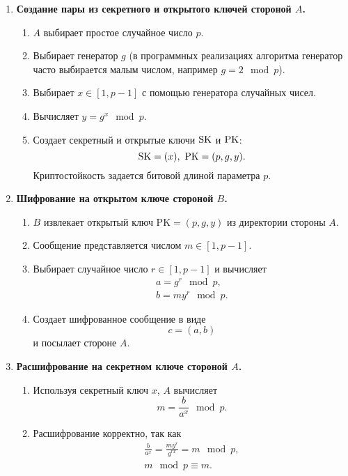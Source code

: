 \begin{enumerate}
    \item \textbf{Создание пары из секретного и открытого ключей стороной $A$.}
        \begin{enumerate}
            \item $A$ выбирает простое случайное число $p$.
            \item Выбирает генератор $g$ (в программных реализациях алгоритма генератор часто выбирается малым числом, например $g = 2 \mod p$).
            \item Выбирает $x \in [1, p-1]$ с помощью генератора случайных чисел.
            \item Вычисляет $y=g^{x}\mod p$.
            \item Создает секретный и открытые ключи $\textrm{SK}$ и $\textrm{PK}$:
                \[ \textrm{SK} = (x), ~ \textrm{PK} = (p, g, y). \]
                Криптостойкость задается битовой длиной параметра $p$.
        \end{enumerate}
    \item \textbf{Шифрование на открытом ключе стороной $B$.}
        \begin{enumerate}
            \item $B$ извлекает открытый ключ $\text{PK} = (p, g, y)$ из директории стороны $A$.
            \item Сообщение представляется числом $m \in [1,p-1]$.
            \item Выбирает случайное число $r \in [1, p-1]$ и вычисляет
                \[ \begin{array}{l}
                    a = g^r \mod p, \\
                    b = m y^r \mod p.
                \end{array} \]
            \item Создает шифрованное сообщение в виде
                \[ c = (a,b) \]
                и посылает стороне $A$.
        \end{enumerate}
    \item \textbf{Расшифрование на секретном ключе стороной $A$.}
        \begin{enumerate}
            \item Используя секретный ключ $x$, $A$ вычисляет
                \[ m = \frac{b}{a^x} \mod p. \]
            \item Расшифрование корректно, так как
                \[ \begin{array}{l}
                    \frac{b}{a^x} = \frac{m y^r}{g^{rx}} = m \mod p, \\
                    m \mod p \equiv m.
                \end{array} \]
        \end{enumerate}
\end{enumerate}


